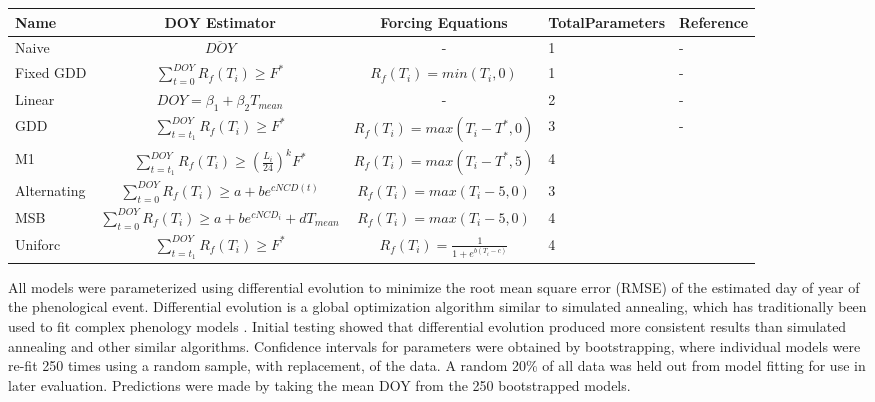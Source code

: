 \documentclass[fleqn,10pt,lineno]{wlpeerj} %
\begin{document}
\begin{center}
{\def\arraystretch{2}\tabcolsep=5pt
    \begin{tabular}{ | l | c | c | p{1.3cm} | l |}
    \hline
    Name & DOY Estimator & Forcing Equations & Total\newline Parameters & Reference \\ \hline
    Naive & \( \overline{DOY} \) & - & 1 & - \\
    Fixed GDD &$\sum_{t=0}^{DOY}R_{f}(T_{i})\geq F^{*} $  & $R_{f}(T_{i}) = min(T_{i}, 0)$ & 1 & - \\
    Linear & \( DOY = \beta_{1} + \beta_{2}T_{mean} \) & - & 2 & - \\
    GDD & $\sum_{t=t_{1}}^{DOY}R_{f}(T_{i})\geq F^{*} $ & $ R_{f}(T_{i}) = max(T_{i} - T^{*}, 0) $  & 3 & - \\
    M1 & $\sum_{t=t_{1}}^{DOY}R_{f}(T_{i})\geq (\frac{L_{i}}{24})^{k} F^{*} $ & $ R_{f}(T_{i}) = max(T_{i}-T^{*}, 5) $  & 4 & \citep{blumel2012} \\
    Alternating & $\sum_{t=0}^{DOY}R_{f}(T_{i})\geq a + be^{cNCD(t)} $ & $R_{f}(T_{i}) = max(T_{i}-5, 0) $ & 3 & \citep{cannell1983} \\
    MSB & $\sum_{t=0}^{DOY}R_{f}(T_{i})\geq a + be^{cNCD_{i}} +dT_{mean} $ & $R_{f}(T_{i}) = max(T_{i}-5, 0) $ & 4 & \citep{jeong2013} \\
    Uniforc &  $\sum_{t=t_{1}}^{DOY}R_{f}(T_{i})\geq F^{*} $ & $ R_{f}(T_{i}) = \frac{1}{1 + e^{b(T_{i}-c)}} $ & 4 & \citep{chuine2000} \\

    \hline
    \end{tabular}
    }
\end{center}

All models were parameterized using differential evolution to minimize the root mean square error (RMSE) of the estimated day of year of the phenological event. Differential evolution is a global optimization algorithm similar to simulated annealing, which has traditionally been used to fit complex phenology models \citep{storn1997, chuine2000}. Initial testing showed that differential evolution produced more consistent results than simulated annealing and other similar algorithms. Confidence intervals for parameters were obtained by bootstrapping, where individual models were re-fit 250 times using a random sample, with replacement, of the data. A random 20\% of all data was held out from model fitting for use in later evaluation. Predictions were made by taking the mean DOY from the 250 bootstrapped models. 
\end{document}
